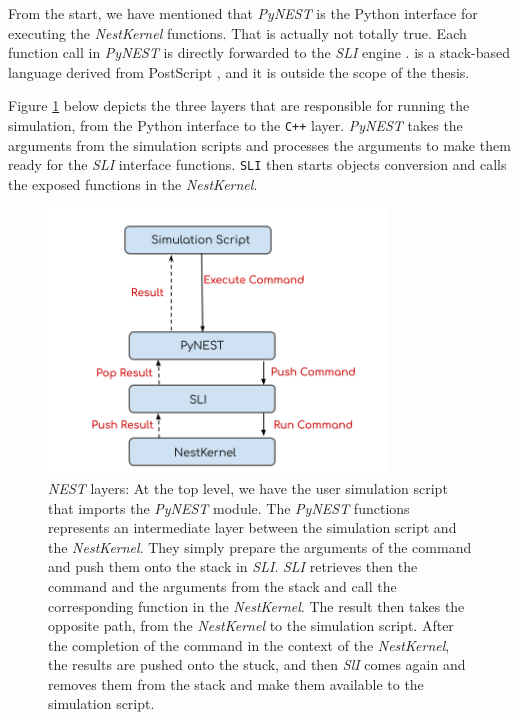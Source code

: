 From the start, we have mentioned that \emph{PyNEST} is the Python interface for executing the \emph{NestKernel} functions. That is actually not totally true. Each function call in \emph{PyNEST} is directly forwarded to the \emph{SLI} engine \citep{gewaltig2007nest}.  is a stack-based language derived from PostScript \citep{adobe1990postscript}, and it is outside the scope of the thesis.

Figure \ref{fig:layer} below depicts the three layers that are responsible for running the simulation, from the Python interface to the \texttt{C++} layer. \emph{PyNEST} takes the arguments from the simulation scripts and processes the arguments to make them ready for the \emph{SLI} interface functions. \texttt{SLI} then starts objects conversion and calls the exposed functions in the \emph{NestKernel}.

\begin{figure}[h!]
\centering
\includegraphics[width=0.8\textwidth]{src/pic/layers.png}
\caption{\emph{NEST} layers: At the top level, we have the user simulation script that imports the \emph{PyNEST} module. The \emph{PyNEST} functions represents an intermediate layer between the simulation script and the \emph{NestKernel}. They simply prepare the arguments of the command and push them onto the stack in \emph{SLI}. \emph{SLI} retrieves then the command and the arguments from the stack and call the corresponding function in the \emph{NestKernel}. The result then takes the opposite path, from the \emph{NestKernel} to the simulation script. After the completion of the command in the context of the \emph{NestKernel}, the results are pushed onto the stuck, and then \emph{SlI} comes again and removes them from the stack and make them available to the simulation script.}
\label{fig:layer}
\end{figure}

